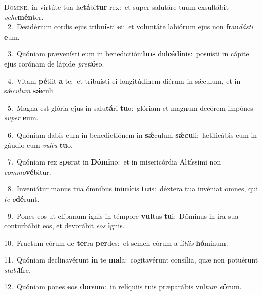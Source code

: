 \lettrine{\initial\textcolor{\initialcolor}{D}}{ómine,} in virtúte tua læ\-\textbf{tá}\-bi\textbf{tur} rex:~\star et super salutáre tuum exsultábit \textit{ve}\-\textit{he}\textbf{mén}ter.\\
{\numbfont\textcolor{\numbcolor}{~2.}}~Desidérium cordis ejus tribu\-\textbf{ís}\-ti \textbf{e}\-i:~\star et voluntáte labiórum ejus non frau\-\textit{dás}\-\textit{ti} \textbf{e}\-um.\par
{\numbfont\textcolor{\numbcolor}{~3.}}~Quóniam prævenísti eum in benedictióni\textbf{bus} dul\-\textbf{cé}\-\textbf{di}nis:~\star posuísti in cápite ejus corónam de lápide \textit{pre}\-\textit{ti}\textbf{ó}so.\par
{\numbfont\textcolor{\numbcolor}{~4.}}~Vitam \textbf{pé}\-tiit \textbf{a} te:~\star et tribuísti ei longitúdinem diérum in sǽculum, et in sǽ\-\textit{cu}\-\textit{lum} \textbf{sǽ}\-culi.\par
{\numbfont\textcolor{\numbcolor}{~5.}}~Magna est glória ejus in salu\-\textbf{tá}\-ri \textbf{tu}\-o:~\star glóriam et magnum decórem impónes \textit{su}\-\textit{per} \textbf{e}\-um.\par
{\numbfont\textcolor{\numbcolor}{~6.}}~Quóniam dabis eum in benedictiónem in \textbf{sǽ}\-culum \textbf{sǽ}\-\textbf{cu}li:~\star lætificábis eum in gáudio cum \textit{vul}\-\textit{tu} \textbf{tu}\-o.\par
{\numbfont\textcolor{\numbcolor}{~7.}}~Quóniam rex \textbf{spe}\-rat in \textbf{Dó}\-\textbf{mi}no:~\star et in misericórdia Altíssimi non \textit{com}\-\textit{mo}\textbf{vé}bitur.\par
{\numbfont\textcolor{\numbcolor}{~8.}}~Inveniátur manus tua ómnibus ini\-\textbf{mí}\-cis \textbf{tu}\-is:~\star déxtera tua invéniat omnes, qui \textit{te} \textit{o}\-\textbf{dé}runt.\par
{\numbfont\textcolor{\numbcolor}{~9.}}~Pones eos ut clíbanum ignis in témpore \textbf{vul}\-tus \textbf{tu}\-i:~\star Dóminus in ira sua conturbábit eos, et devorábit \textit{e}\-\textit{os} \textbf{i}\-gnis.\par
{\numbfont\textcolor{\numbcolor}{10.}}~Fructum eórum de \textbf{ter}\-ra \textbf{per}\-des:~\star et semen eórum a fí\-\textit{li}\-\textit{is} \textbf{hó}\-minum.\par
{\numbfont\textcolor{\numbcolor}{11.}}~Quóniam declinavérunt \textbf{in} te \textbf{ma}\-la:~\star cogitavérunt consília, quæ non potuérunt \textit{sta}\-\textit{bi}\textbf{lí}re.\par
{\numbfont\textcolor{\numbcolor}{12.}}~Quóniam pones \textbf{e}\-os \textbf{dor}\-sum:~\star in relíquiis tuis præparábis vul\textit{tum} \textit{e}\-\textbf{ó}rum.\par
